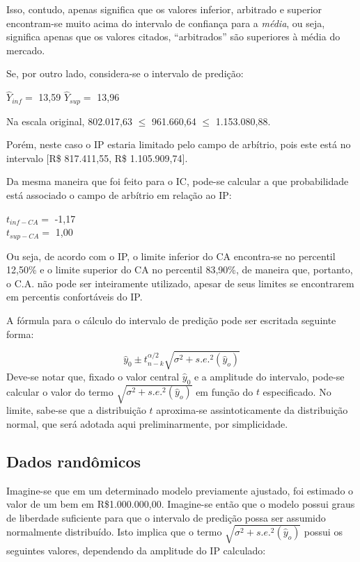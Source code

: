 \documentclass[a4paper, 12pt]{article}
\begin{document}
Isso, contudo, apenas significa que os valores inferior, arbitrado e
superior encontram-se muito acima do intervalo de confiança para a
\emph{média}, ou seja, significa apenas que os valores citados,
``arbitrados'' são superiores à média do mercado.

Se, por outro lado, considera-se o intervalo de predição:

\(\hat Y_{inf} =\) 13,59 \(\hat Y_{sup} =\) 13,96

Na escala original, 802.017,63 \(\leq\) 961.660,64 \(\leq\)
1.153.080,88.

Porém, neste caso o IP estaria limitado pelo campo de arbítrio, pois
este está no intervalo {[}R\$ 817.411,55, R\$ 1.105.909,74{]}.

Da mesma maneira que foi feito para o IC, pode-se calcular a que
probabilidade está associado o campo de arbítrio em relação ao IP:

\(t_{inf-CA} =\) -1,17\\
\(t_{sup-CA} =\) 1,00

Ou seja, de acordo com o IP, o limite inferior do CA encontra-se no
percentil 12,50\% e o limite superior do CA no percentil 83,90\%, de
maneira que, portanto, o C.A. não pode ser inteiramente utilizado,
apesar de seus limites se encontrarem em percentis confortáveis do IP.

A fórmula para o cálculo do intervalo de predição pode ser escritada
seguinte forma:

\[\hat y_0 \pm t_{n-k}^{\alpha/2}\sqrt{\sigma^2+s.e.^2(\hat y_o)}\]
Deve-se notar que, fixado o valor central \(\hat y_0\) e a amplitude do
intervalo, pode-se calcular o valor do termo
\(\sqrt{\sigma^2+s.e.^2(\hat y_o)}\) em função do \(t\) especificado. No
limite, sabe-se que a distribuição \(t\) aproxima-se assintoticamente da
distribuição normal, que será adotada aqui preliminarmente, por
simplicidade.

\hypertarget{dados-randomicos}{%
\subsection{Dados randômicos}\label{dados-randomicos}}

Imagine-se que em um determinado modelo previamente ajustado, foi
estimado o valor de um bem em R\$1.000.000,00. Imagine-se então que o
modelo possui graus de liberdade suficiente para que o intervalo de
predição possa ser assumido normalmente distribuído. Isto implica que o
termo \(\sqrt{\sigma^2+s.e.^2(\hat y_o)}\) possui os seguintes valores,
dependendo da amplitude do IP calculado:
\end{document}
